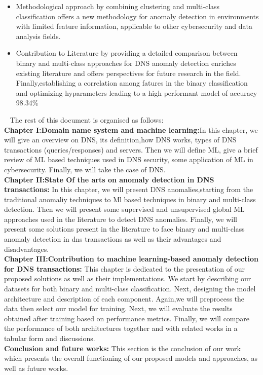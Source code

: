\begin{itemize}
    \item{Methodological approach by combining clustering and multi-class classification offers a new methodology for anomaly detection in environments with limited feature information, applicable to other cybersecurity and data analysis fields.}
\end{itemize}
\begin{itemize}
    \item{Contribution to Literature by providing a detailed comparison between binary and multi-class approaches for DNS anomaly detection enriches existing literature and offers perspectives for future research in the field. Finally,establishing a correlation among fatures in the binary classification and optimizing hyparameters leading to a high performant model of accuracy 98.34\%}
\end{itemize}
\
The rest of this document is organised as follows:\\
\textbf{Chapter I:Domain name system and machine learning:}In this chapter, we will
give an overview on DNS, its definition,how DNS works, types of DNS transactions (queries/responses) and servers. Then we will define ML, give a brief review of ML based techniques used in DNS security, some application of ML in cybersecurity. Finally, we will take the case of DNS.\\
\textbf{Chapter II:State Of the arts on anomaly detection in DNS transactions:}
In this chapter,
we will present DNS anomalies,starting from the traditional anomaliy techniques to Ml based techniques in binary and multi-class detection. Then we will present some supervised and unsupervised global ML approaches used in the literature to detect DNS anomalies. Finally, we will present some solutions present in the literature to face binary and multi-class anomaly detection in dns transactions as well as their advantages and disadvantages.\\
\textbf{Chapter III:Contribution to machine learning-based anomaly detection for DNS transactions:}
This chapter is dedicated to the presentation of our proposed solutions as well as their implementations. We start by describing our datasets for both binary and multi-class classification. Next, designing the model architecture and description of each component. Again,we will preprocess the data then select our model for training. Next, we will evaluate the results obtained after training based on performance metrics. Finally, we will compare the performance of both architectures together and with related works in a tabular form and discussions.\\
\textbf{Conclusion and future works:}
This section is the conclusion of our work which presents the overall functioning of our proposed models and approaches, as well as future works.
\myCleanStarChapterEnd
